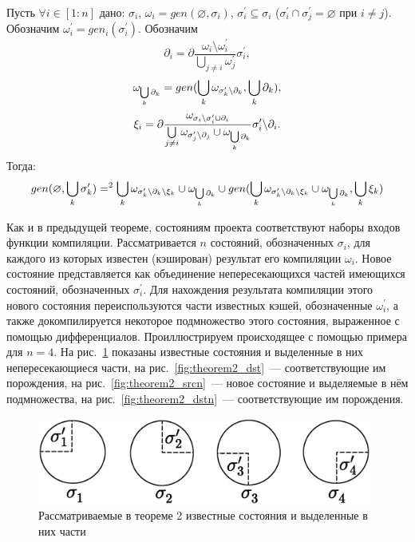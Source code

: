 Пусть $\forall i \in [1:n]$ дано: $\sigma_i$, $\omega_i = gen(\varnothing, \sigma_i)$, $\sigma_i^\prime \subseteq \sigma_i$ ($\sigma_i^\prime \cap \sigma_j^\prime = \varnothing$ при $i \neq j$). Обозначим $\omega_i^\prime = gen_i(\sigma_i^\prime)$. Обозначим 
$$\partial_i = \partial\dfrac{\omega_i \setminus \omega_i^\prime}{\bigcup\limits_{j \neq i} \omega_j^\prime} \sigma_i^\prime,$$
$$\omega_{\bigcup\limits_k {\partial_k}} = gen(\bigcup\limits_k \omega_{{\sigma^\prime_k}{\setminus}{\partial_k}}, \bigcup\limits_k {\partial_k}),$$
$$\xi_i = \partial\dfrac{\omega_{{\sigma_i}{\setminus}{\sigma^\prime_i} \cup {\partial_i}}}{\bigcup\limits_{j \neq i} \omega_{{\sigma^\prime_j}{\setminus}{\partial_j}} \cup \omega_{\bigcup\limits_k \partial_k}} {\sigma^\prime_i}{\setminus}{\partial_i}.$$
Тогда:
$$gen(\varnothing, \bigcup\limits_k {\sigma^\prime_k}) =^2 \bigcup\limits_k \omega_{{\sigma^\prime_k}{\setminus}{\partial_k}{\setminus}{\xi_k}} \cup \omega_{\bigcup\limits_k \partial_k} \cup gen(\bigcup\limits_k \omega_{{\sigma^\prime_k}{\setminus}{\partial_k}{\setminus}{\xi_k}} \cup \omega_{\bigcup\limits_k \partial_k}, \bigcup\limits_k {\xi_k})$$

Как и в предыдущей теореме, состояниям проекта соответствуют наборы входов функции компиляции. Рассматривается $n$ состояний, обозначенных $\sigma_i$, для каждого из которых известен (кэширован) результат его компиляции $\omega_i$. Новое состояние представляется как объединение непересекающихся частей имеющихся состояний, обозначенных $\sigma^\prime_i$. Для нахождения результата компиляции этого нового состояния переиспользуются части известных кэшей, обозначенные $\omega^\prime_i$, а также докомпилируется некоторое подмножество этого состояния, выраженное с помощью дифференциалов. Проиллюстрируем происходящее с помощью примера для $n = 4$. На рис.~\ref{fig:theorem2_src} показаны известные состояния и выделенные в них непересекающиеся части, на рис.~\ref{fig:theorem2_dst}~--- соответствующие им порождения, на рис.~\ref{fig:theorem2_srcn}~--- новое состояние и выделяемые в нём подмножества, на рис.~\ref{fig:theorem2_dstn}~--- соответствующие им порождения.

\begin{figure}[h!]
	\centering
	\includegraphics[width=11cm]{theorem2_src.eps}
	\caption{Рассматриваемые в теореме 2 известные состояния и выделенные в них части}
	\label{fig:theorem2_src}
\end{figure}

